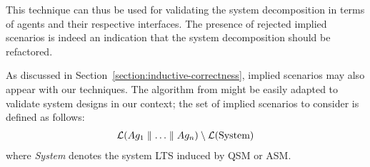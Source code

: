 This technique can thus be used for validating the system decomposition in terms of agents and their respective interfaces. The presence of rejected implied scenarios is indeed an indication that the system decomposition should be refactored.

As discussed in Section~\ref{section:inductive-correctness}, implied scenarios may also appear with our techniques. The algorithm from \cite{Uchitel:2004} might be easily adapted to validate system designs in our context; the set of implied scenarios to consider is defined as follows:
\begin{align*}
\mathcal{L}(Ag_1 \parallel \ldots \parallel Ag_n) \setminus \mathcal{L}(\mbox{System})
\end{align*}
where \emph{System} denotes the system LTS induced by QSM or ASM.






